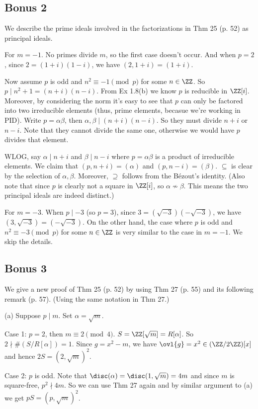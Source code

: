 \documentclass[../Chapter.tex]{subfiles}
\begin{document}
\subsection*{Bonus 2}

We describe the prime ideals involved in the factorizations in Thm 25 (p. 52) as principal ideals.

For $m=-1$. No primes divide $m$, so the first case doesn't occur. And when $p=2$, since $2=(1+i)(1-i)$, we have $(2,1+i)=(1+i)$.

Now assume $p$ is odd and $n^2\equiv -1 \pmod{p}$ for some $n\in\ZZ$. So $p\mid n^2+1=(n+i)(n-i)$. From Ex 1.8(b) we know $p$ is reducible in $\ZZ[i]$. Moreover, by considering the norm it's easy to see that $p$ can only be factored into two irreducible elements (thus, prime elements, becasue we're working in PID). Write $p=\alpha\beta$, then $\alpha,\beta\mid(n+i)(n-i)$. So they must divide $n+i$ or $n-i$. Note that they cannot divide the same one, otherwise we would have $p$ divides that element.

WLOG, say $\alpha\mid n+i$ and $\beta\mid n-i$ where $p=\alpha\beta$ is a product of irreducible elements. We claim that $(p,n+i)=(\alpha)$ and $(p,n-i)=(\beta)$. $\subseteq$ is clear by the selection of $\alpha,\beta$. Moreover, $\supseteq$ follows from the Bézout's identity. (Also note that since $p$ is clearly not a square in $\ZZ[i]$, so $\alpha\nsim\beta$. This means the two principal ideals are indeed distinct.)

For $m=-3$. When $p\mid -3$ (so $p=3$), since $3=(\sqrt{-3})(-\sqrt{-3})$, we have $(3,\sqrt{-3})=(-\sqrt{-3})$. On the other hand, the case where $p$ is odd and $n^2\equiv -3 \pmod{p}$ for some $n\in\ZZ$ is very similar to the case in $m=-1$. We skip the details.

\subsection*{Bonus 3}

We give a new proof of Thm 25 (p. 52) by using Thm 27 (p. 55) and its following remark (p. 57). (Using the same notation in Thm 27.)

(a) Suppose $p\mid m$. Set $\alpha=\sqrt{m}$. 

Case 1: $p=2$, then $m\equiv 2 \pmod{4}$. $S=\ZZ[\sqrt{m}]=R[\alpha]$. So $2\nmid \#(S/R[\alpha])=1$. Since $g=x^2-m$, we have $\ovl{g}=x^2\in(\ZZ/2\ZZ)[x]$ and hence $2S=(2,\sqrt{m})^2$.

Case 2: $p$ is odd. Note that $\disc(\alpha)=\disc(1,\sqrt{m})=4m$ and since $m$ is square-free, $p^2\nmid 4m$. So we can use Thm 27 again and by similar argument to (a) we get $pS=(p,\sqrt{m})^2$.
\end{document}
